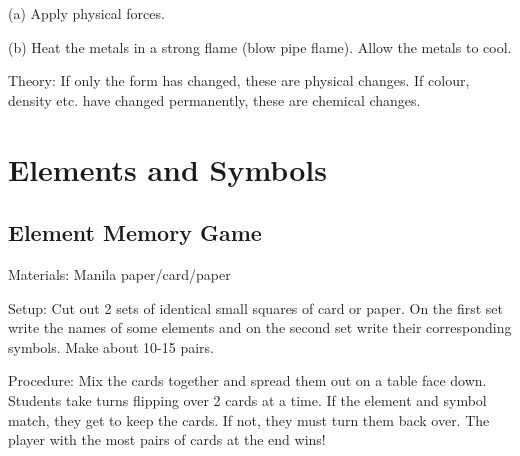\begin{multicols}{2}
\begin{description*}
{(a) Apply physical forces.

(b) Heat the metals in a strong flame (blow pipe
flame). Allow the metals to cool.}
\item[Theory:]{If only the form has changed, these are
physical changes. If colour, density etc. have
changed permanently, these are chemical
changes.}
\end{description*}


\section*{Elements and Symbols} 


\subsection{Element Memory Game} %


\begin{description*}
\item[Materials:]{Manila paper/card/paper}
\item[Setup:]{Cut out 2 sets of identical small squares of card or paper. On the first set write the names of some elements and on the second set write their corresponding symbols. Make about 10-15 pairs. }
\item[Procedure:]{Mix the cards together and spread them out on a table face down. Students take turns flipping over 2 cards at a time. If the element and symbol match, they get to keep the cards. If not, they must turn them back over. The player with the most pairs of cards at the end wins!}
\end{description*}


\end{multicols}
